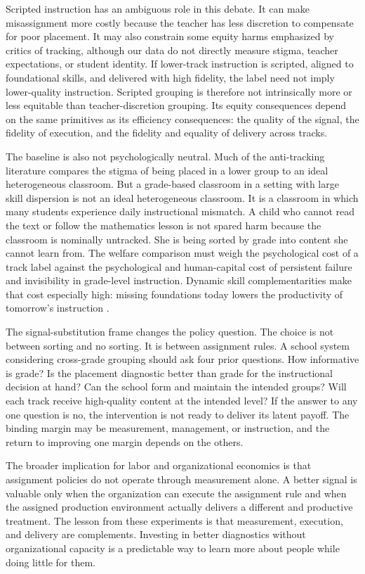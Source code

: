 \documentclass[11pt]{article}
\begin{document}
Scripted instruction has an ambiguous role in this debate. It can make misassignment more costly because the teacher has less discretion to compensate for poor placement. It may also constrain some equity harms emphasized by critics of tracking, although our data do not directly measure stigma, teacher expectations, or student identity. If lower-track instruction is scripted, aligned to foundational skills, and delivered with high fidelity, the label need not imply lower-quality instruction. Scripted grouping is therefore not intrinsically more or less equitable than teacher-discretion grouping. Its equity consequences depend on the same primitives as its efficiency consequences: the quality of the signal, the fidelity of execution, and the fidelity and equality of delivery across tracks.

The baseline is also not psychologically neutral. Much of the anti-tracking literature compares the stigma of being placed in a lower group to an ideal heterogeneous classroom. But a grade-based classroom in a setting with large skill dispersion is not an ideal heterogeneous classroom. It is a classroom in which many students experience daily instructional mismatch. A child who cannot read the text or follow the mathematics lesson is not spared harm because the classroom is nominally untracked. She is being sorted by grade into content she cannot learn from. The welfare comparison must weigh the psychological cost of a track label against the psychological and human-capital cost of persistent failure and invisibility in grade-level instruction. Dynamic skill complementarities make that cost especially high: missing foundations today lowers the productivity of tomorrow's instruction \citep{cunhaheckman2007}.

The signal-substitution frame changes the policy question. The choice is not between sorting and no sorting. It is between assignment rules. A school system considering cross-grade grouping should ask four prior questions. How informative is grade? Is the placement diagnostic better than grade for the instructional decision at hand? Can the school form and maintain the intended groups? Will each track receive high-quality content at the intended level? If the answer to any one question is no, the intervention is not ready to deliver its latent payoff. The binding margin may be measurement, management, or instruction, and the return to improving one margin depends on the others.

The broader implication for labor and organizational economics is that assignment policies do not operate through measurement alone. A better signal is valuable only when the organization can execute the assignment rule and when the assigned production environment actually delivers a different and productive treatment. The lesson from these experiments is that measurement, execution, and delivery are complements. Investing in better diagnostics without organizational capacity is a predictable way to learn more about people while doing little for them.
\end{document}
